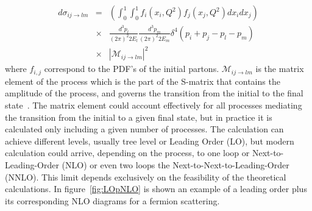 \begin{eqnarray}
  \label{eq:DiffXS}
  d\sigma_{ij\rightarrow lm} & = & \left( \int_{0}^{1}\int_{0}^{1}f_{i}(x_{i},Q^{2})f_{j}(x_{j},Q^{2})dx_{i}dx_{j} \right) \nonumber \\  
 & \times & \frac{d^{3}p_{l}}{(2\pi)^{2}2E_{l}}\frac{d^{3}p_{m}}{(2\pi)^{2}2E_{m}}\delta^{4}\left( p_{i}+p_{j}-p_{l}-p_{m} \right) \nonumber \\  
 & \times & |\mathcal{M}_{ij\rightarrow lm}|^{2}
\end{eqnarray} where $f_{i,j}$ correspond to the PDF's of the initial partons. $\mathcal{M}_{ij\rightarrow lm}$ is the matrix element of the process which is the part of the S-matrix that contains the amplitude of the process, and governs the transition from the initial to the final state~\cite{opac-b1131978}. The matrix element could account effectively for all processes mediating the transition from the initial to a given final state, but in practice it is calculated only including a given number of processes. The calculation can achieve different levels, usually tree level or Leading Order (LO), but modern calculation could arrive, depending on the process, to one loop or Next-to-Leading-Order (NLO) or even two loops the  Next-to-Next-to-Leading-Order (NNLO). This limit depends exclusively on the feasibility of the theoretical calculations. In figure~\ref{fig:LOpNLO} is shown an example of a leading order plus its corresponding NLO diagrams for a fermion scattering.

